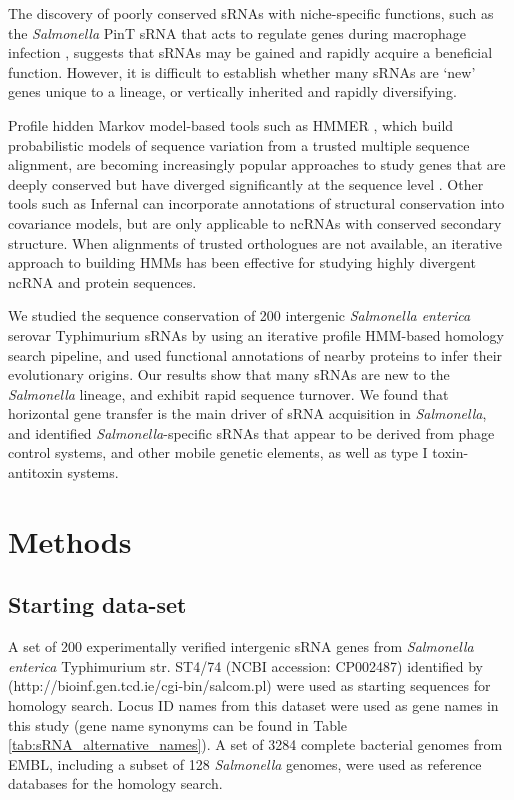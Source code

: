 The discovery of poorly conserved sRNAs with niche-specific functions, such as the \textit{Salmonella} PinT sRNA that acts to regulate genes during macrophage infection \citep{Westermann2016-mr}, suggests that sRNAs may be gained and rapidly acquire a beneficial function. However, it is difficult to establish whether many sRNAs are ‘new’ genes unique to a lineage, or vertically inherited and rapidly diversifying.

Profile hidden Markov model-based tools such as HMMER \citep{Eddy2009-xhmmer}, which build probabilistic models of sequence variation from a trusted multiple sequence alignment, are becoming increasingly popular approaches to study genes that are deeply conserved but have diverged significantly at the sequence level \citep{Eddy2011-xhi}. Other tools such as Infernal \citep{Nawrocki2013-jjjjq} can incorporate annotations of structural conservation into covariance models, but are only applicable to ncRNAs with conserved secondary structure. When alignments of trusted orthologues are not available, an iterative approach to building HMMs has been effective for studying highly divergent ncRNA \citep{Barquist2016-qt} and protein \citep{Johnson2010-rs} sequences.

We studied the sequence conservation of 200 intergenic \textit{Salmonella enterica} serovar Typhimurium sRNAs by using an iterative profile HMM-based homology search pipeline, and used functional annotations of nearby proteins to infer their evolutionary origins. Our results show that many sRNAs are new to the \textit{Salmonella} lineage, and exhibit rapid sequence turnover. We found that horizontal gene transfer is the main driver of sRNA acquisition in \textit{Salmonella}, and identified \textit{Salmonella}-specific sRNAs that appear to be derived from phage control systems, and other mobile genetic elements, as well as type I toxin-antitoxin systems.

\section{Methods}

\subsection{Starting data-set}

A set of 200 experimentally verified intergenic sRNA genes from \textit{Salmonella enterica} Typhimurium str. ST4/74 (NCBI accession: CP002487) identified by \cite{Kroger2013-pg} (http://bioinf.gen.tcd.ie/cgi-bin/salcom.pl) were used as starting sequences for homology search. Locus ID names from this dataset were used as gene names in this study (gene name synonyms can be found in Table \ref{tab:sRNA_alternative_names}). A set of 3284 complete bacterial genomes from EMBL, including a subset of 128 \textit{Salmonella} genomes, were used as reference databases for the homology search.
